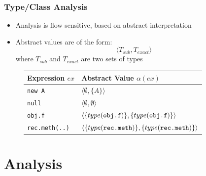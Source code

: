 \documentclass[hyperref={pdfpagelabels=false}]{beamer}
\begin{document}
\begin{frame}[fragile]
    \frametitle{Type/Class Analysis}
    \begin{itemize}
        \item Analysis is flow sensitive, based on abstract interpretation
        \item Abstract values are of the form:
$$ \langle T_{sub}, T_{exact} \rangle $$
where $T_{sub}$ and $T_{exact}$ are two sets of types
    \end{itemize}

\begin{figure}
    \begin{tabular}{ l | l }
        Expression $ex$       & Abstract Value $\alpha(ex)$\\
        \hline
        \verb/new A/          & $\langle \emptyset, \{ A \} \rangle$ \\
        \verb/null/           & $\langle \emptyset, \emptyset \rangle$ \\
        \verb/obj.f/            & $\langle\{type(\verb/obj.f/)\}, \{type(\verb/obj.f/)\} \rangle$ \\
        \verb/rec.meth(..)/   & $\langle\{type(\verb/rec.meth/)\}, \{type(\verb/rec.meth/)\} \rangle$ \\
    \end{tabular}
\end{figure}
\end{frame}

\section{Analysis}
\begin{frame}
\end{frame}
\end{document}
